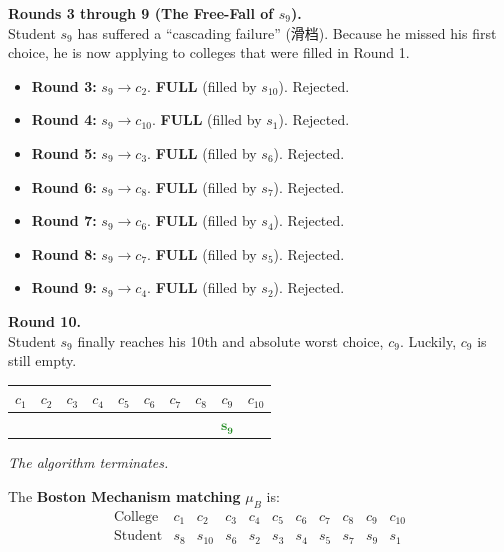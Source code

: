 {\medskip
\noindent\textbf{Rounds 3 through 9 (The Free-Fall of $s_9$).} \\
Student $s_9$ has suffered a ``cascading failure'' (滑档). Because he missed his first choice, he is now applying to colleges that were filled in Round 1. 
\begin{itemize}
    \item \textbf{Round 3:} $s_9 \to c_2$. \textbf{FULL} (filled by $s_{10}$). Rejected.
    \item \textbf{Round 4:} $s_9 \to c_{10}$. \textbf{FULL} (filled by $s_1$). Rejected.
    \item \textbf{Round 5:} $s_9 \to c_3$. \textbf{FULL} (filled by $s_6$). Rejected.
    \item \textbf{Round 6:} $s_9 \to c_8$. \textbf{FULL} (filled by $s_7$). Rejected.
    \item \textbf{Round 7:} $s_9 \to c_6$. \textbf{FULL} (filled by $s_4$). Rejected.
    \item \textbf{Round 8:} $s_9 \to c_7$. \textbf{FULL} (filled by $s_5$). Rejected.
    \item \textbf{Round 9:} $s_9 \to c_4$. \textbf{FULL} (filled by $s_2$). Rejected.
\end{itemize}

\medskip
\noindent\textbf{Round 10.} \\
Student $s_9$ finally reaches his 10th and absolute worst choice, $c_9$. Luckily, $c_9$ is still empty.
\begin{center}
\renewcommand{\arraystretch}{1.2}
\begin{tabular}{cccccccccc}
    \cellcolor{gray!20}$c_1$ & \cellcolor{gray!20}$c_2$ & \cellcolor{gray!20}$c_3$ & \cellcolor{gray!20}$c_4$ & \cellcolor{gray!20}$c_5$ & \cellcolor{gray!20}$c_6$ & \cellcolor{gray!20}$c_7$ & \cellcolor{gray!20}$c_8$ & $c_9$ & \cellcolor{gray!20}$c_{10}$ \\
    \hline
     & & & & & & & & \textcolor{ForestGreen}{$\mathbf{s_9}$} & \\
\end{tabular}
\end{center}
\textit{The algorithm terminates.}

\vspace{0.5cm}
\noindent The \textbf{Boston Mechanism matching} $\mu_B$ is:
\[
\begin{array}{c|cccccccccc}
  \text{College} & c_1 & c_2 & c_3 & c_4 & c_5 & c_6
                 & c_7 & c_8 & c_9 & c_{10} \\
  \hline
  \text{Student} & s_8 & s_{10} & s_6 & s_2 & s_3
                 & s_4 & s_5 & s_7 & s_9 & s_1
\end{array}
\]
}


